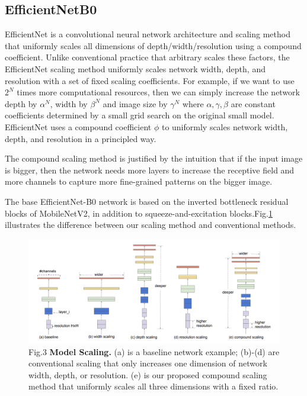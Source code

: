 \documentclass[12pt]{article}
\begin{document}
	\subsection{EfficientNetB0}
	EfficientNet is a convolutional neural network architecture and scaling method that uniformly scales all dimensions of depth/width/resolution using a compound coefficient. Unlike conventional practice that arbitrary scales these factors, the EfficientNet scaling method uniformly scales network width, depth, and resolution with a set of fixed scaling coefficients. For example, if we want to use $2^N$
 times more computational resources, then we can simply increase the network depth by $\alpha ^ N$, width by $\beta ^ N$ and image size by $\gamma ^ N$ where $\alpha, \gamma, \beta$
 are constant coefficients determined by a small grid search on the original small model. EfficientNet uses a compound coefficient $\phi$
 to uniformly scales network width, depth, and resolution in a principled way.

The compound scaling method is justified by the intuition that if the input image is bigger, then the network needs more layers to increase the receptive field and more channels to capture more fine-grained patterns on the bigger image.

The base EfficientNet-B0 network is based on the inverted bottleneck residual blocks of MobileNetV2, in addition to squeeze-and-excitation blocks.Fig.\ref{fig:scaling}
 illustrates the difference
between our scaling method and conventional methods.

\begin{center}
\begin{figure}[H]
\includegraphics[width=1\textwidth]{Figs/scaling.png}
\caption{Fig.3 \textbf{Model Scaling.} (a) is a baseline network example; (b)-(d) are conventional scaling that only increases one dimension of network width, depth, or resolution. (e) is our proposed compound scaling method that uniformly scales all three dimensions with a fixed ratio.}
\label{fig:scaling}
\end{figure}
\end{center}
	
\end{document}
